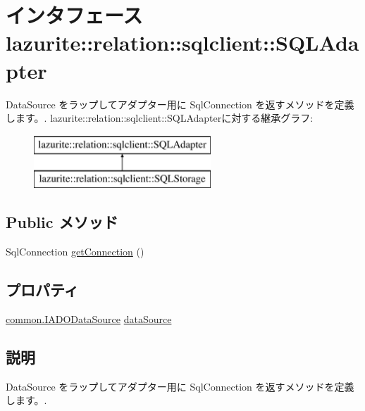 \hypertarget{interfacelazurite_1_1relation_1_1sqlclient_1_1_s_q_l_adapter}{
\section{インタフェース lazurite::relation::sqlclient::SQLAdapter}
\label{interfacelazurite_1_1relation_1_1sqlclient_1_1_s_q_l_adapter}
}


DataSource をラップしてアダプター用に SqlConnection を返すメソッドを定義します。.  
lazurite::relation::sqlclient::SQLAdapterに対する継承グラフ:\begin{figure}[H]
\begin{center}
\leavevmode
\includegraphics[height=2cm]{interfacelazurite_1_1relation_1_1sqlclient_1_1_s_q_l_adapter}
\end{center}
\end{figure}
\subsection*{Public メソッド}
\begin{DoxyCompactItemize}
\item 
SqlConnection \hyperlink{interfacelazurite_1_1relation_1_1sqlclient_1_1_s_q_l_adapter_a9749401dc1c4a2334cdb18a5b32f32e9}{getConnection} ()
\end{DoxyCompactItemize}
\subsection*{プロパティ}
\begin{DoxyCompactItemize}
\item 
\hyperlink{interfacelazurite_1_1relation_1_1common_1_1_i_a_d_o_data_source}{common.IADODataSource} \hyperlink{interfacelazurite_1_1relation_1_1sqlclient_1_1_s_q_l_adapter_ab3bcdebb8e41b05a006fde8ce751af03}{dataSource}
\end{DoxyCompactItemize}


\subsection{説明}
DataSource をラップしてアダプター用に SqlConnection を返すメソッドを定義します。. 

